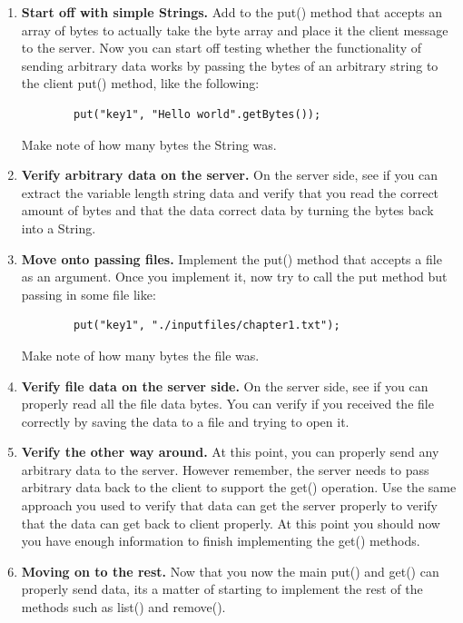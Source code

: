 \documentclass{article}
\begin{document}
\begin{enumerate}
    \item \textbf{Start off with simple Strings.} Add to the put() method that accepts an array of bytes to actually take the byte array and place it the client message to the server. Now you can start off testing whether the functionality of sending arbitrary data works by passing the bytes of an arbitrary string to the client put() method, like the following:
    \begin{verbatim}
        put("key1", "Hello world".getBytes());
    \end{verbatim}
    \vspace{-0.5cm}
    Make note of how many bytes the String was.
    \item \textbf{Verify arbitrary data on the server.} On the server side, see if you can extract the variable length string data and verify that you read the correct amount of bytes and that the data correct data by turning the bytes back into a String.
    \item \textbf{Move onto passing files.} Implement the put() method that accepts a file as an argument. Once you implement it, now try to call the put method but passing in some file like:
    \begin{verbatim}
        put("key1", "./inputfiles/chapter1.txt");
    \end{verbatim}
    \vspace{-0.5cm}
    Make note of how many bytes the file was.
    \item \textbf{Verify file data on the server side.} On the server side, see if you can properly read all the file data bytes. You can verify if you received the file correctly by saving the data to a file and trying to open it.
    \item \textbf{Verify the other way around.} At this point, you can properly send any arbitrary data to the server. However remember, the server needs to pass arbitrary data back to the client to support the get() operation. Use the same approach you used to verify that data can get the server properly to verify that the data can get back to client properly. At this point you should now you have enough information to finish implementing the get() methods.
    \item \textbf{Moving on to the rest.} Now that you now the main put() and get() can properly send data, its a matter of starting to implement the rest of the methods such as list() and remove().
    
\end{enumerate}
\end{document}
